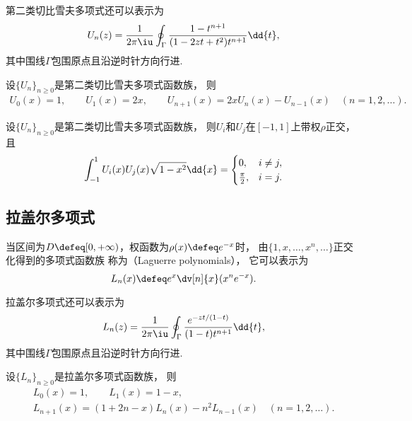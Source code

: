 第二类切比雪夫多项式还可以表示为\begin{equation}
	U_n(z)
	= \frac1{2\pi\iu} \oint_\Gamma \frac{1-t^{n+1}}{(1 - 2 z t + t^2) t^{n+1}} \dd{t},
\end{equation}
其中围线\(\Gamma\)包围原点且沿逆时针方向行进.

\begin{property}
设\(\{U_n\}_{n\geq0}\)是第二类切比雪夫多项式函数族，
则\begin{gather}
	U_0(x) = 1,
	\qquad
	U_1(x) = 2x,
	\qquad
	U_{n+1}(x) = 2x U_n(x) - U_{n-1}(x)
	\quad(n=1,2,\dotsc).
\end{gather}
\end{property}

\begin{property}
设\(\{U_n\}_{n\geq0}\)是第二类切比雪夫多项式函数族，
则\(U_i\)和\(U_j\)在\([-1,1]\)上带权\(\rho\)正交，
且\begin{equation}
	\def\arraystretch{1.5}
	\int_{-1}^1 U_i(x) U_j(x) \sqrt{1-x^2} \dd{x}
	= \begin{cases}
		0, & i \neq j, \\
		\frac\pi2, & i = j.
	\end{cases}
\end{equation}
\end{property}

\subsection{拉盖尔多项式}
当区间为\(D \defeq [0,+\infty)\)，权函数为\(\rho(x) \defeq e^{-x}\)时，
由\(\{1,x,\dotsc,x^n,\dotsc\}\)正交化得到的多项式函数族
称为（Laguerre polynomials），
它可以表示为\begin{equation}
	L_n(x)
	\defeq
	e^x \dv[n]{x} (x^n e^{-x}).
\end{equation}

拉盖尔多项式还可以表示为\begin{equation}
	L_n(z) = \frac1{2\pi\iu} \oint_\Gamma \frac{e^{-zt/(1-t)}}{(1-t)t^{n+1}} \dd{t},
\end{equation}
其中围线\(\Gamma\)包围原点且沿逆时针方向行进.

\begin{property}
设\(\{L_n\}_{n\geq0}\)是拉盖尔多项式函数族，
则\begin{gather}
	L_0(x) = 1,
	\qquad
	L_1(x) = 1-x, \\
	L_{n+1}(x) = (1+2n-x) L_n(x) - n^2 L_{n-1}(x)
	\quad(n=1,2,\dotsc).
\end{gather}
\end{property}

